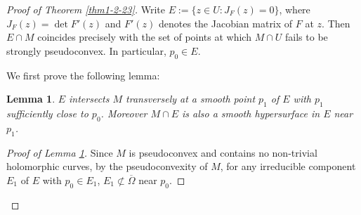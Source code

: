 \documentclass[a4paper,centertags,oneside,12pt]{amsart}
\newtheorem{lemma}[theorem]{Lemma}
\numberwithin{equation}{section}
\begin{document}
\begin{proof}[Proof of Theorem \ref{thm1-2-23}]
Write \( E:=\{z\in U: J_F(z)=0\}\), where \(J_F(z)=\det F'(z)\) and \(F'(z)\) denotes the Jacobian matrix of \(F\) at \(z\). Then \( E\cap M\) coincides precisely with the set of points at which \( M\cap U\) fails to be strongly pseudoconvex. In particular, $p_0\in E$.


We first  prove the following lemma:
\begin{lemma}\label{claim10}$E$ intersects $M$  transversely at a smooth point $p_1$ of $E$ with $p_1$ sufficiently close to $p_0$. Moreover $M\cap E$ is also a smooth hypersurface in $E$ near $p_1$.
\end{lemma}
\begin{proof}[Proof of Lemma \ref{claim10}]
Since  $M$ is pseudoconvex and contains no non-trivial holomorphic curves, by the pseudoconvexity of $M$, for any irreducible component $E_1$ of $E$ with $p_0\in E_1$, $E_1 \not \subset \overline\Omega$ near $p_0$. 


\end{proof}
\end{proof}
\end{document}
